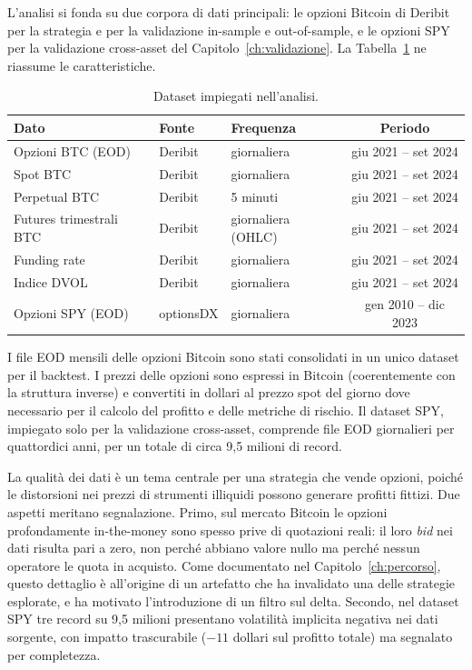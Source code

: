 L'analisi si fonda su due corpora di dati principali: le opzioni Bitcoin di
Deribit per la strategia e per la validazione in-sample e out-of-sample, e
le opzioni SPY per la validazione cross-asset del
Capitolo~\ref{ch:validazione}. La Tabella~\ref{tab:dataset} ne riassume le
caratteristiche.

\begin{table}[H]
\centering
\caption{Dataset impiegati nell'analisi.}
\label{tab:dataset}
\small
\begin{tabular}{lllc}
\toprule
\textbf{Dato} & \textbf{Fonte} & \textbf{Frequenza} & \textbf{Periodo} \\
\midrule
Opzioni BTC (EOD) & Deribit & giornaliera & giu 2021 -- set 2024 \\
Spot BTC & Deribit & giornaliera & giu 2021 -- set 2024 \\
Perpetual BTC & Deribit & 5 minuti & giu 2021 -- set 2024 \\
Futures trimestrali BTC & Deribit & giornaliera (OHLC) & giu 2021 -- set 2024 \\
Funding rate & Deribit & giornaliera & giu 2021 -- set 2024 \\
Indice DVOL & Deribit & giornaliera & giu 2021 -- set 2024 \\
Opzioni SPY (EOD) & optionsDX & giornaliera & gen 2010 -- dic 2023 \\
\bottomrule
\end{tabular}
\end{table}

I file EOD mensili delle opzioni Bitcoin sono stati consolidati in un unico
dataset per il backtest. I prezzi delle opzioni sono espressi in Bitcoin
(coerentemente con la struttura inverse) e convertiti in dollari al prezzo
spot del giorno dove necessario per il calcolo del profitto e delle
metriche di rischio. Il dataset SPY, impiegato solo per la validazione
cross-asset, comprende file EOD giornalieri per quattordici anni, per un
totale di circa 9,5 milioni di record.

La qualità dei dati è un tema centrale per una strategia che vende opzioni,
poiché le distorsioni nei prezzi di strumenti illiquidi possono generare
profitti fittizi. Due aspetti meritano segnalazione. Primo, sul mercato
Bitcoin le opzioni profondamente in-the-money sono spesso prive di
quotazioni reali: il loro \emph{bid} nei dati risulta pari a zero, non
perché abbiano valore nullo ma perché nessun operatore le quota in
acquisto. Come documentato nel Capitolo~\ref{ch:percorso}, questo dettaglio
è all'origine di un artefatto che ha invalidato una delle strategie
esplorate, e ha motivato l'introduzione di un filtro sul delta. Secondo,
nel dataset SPY tre record su 9,5 milioni presentano volatilità implicita
negativa nei dati sorgente, con impatto trascurabile ($-11$ dollari sul
profitto totale) ma segnalato per completezza.

